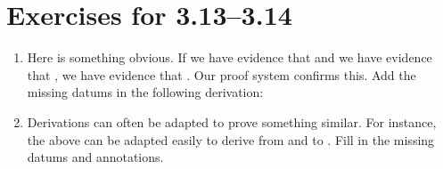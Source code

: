 
\section*{Exercises for 3.13--3.14}

\begin{enumerate}
\item  Here is something obvious. If we have evidence that  and we 
 have evidence that , we have evidence that . Our proof system 
 confirms this. Add the missing datums in the following derivation:

\begin{argument*}










\end{argument*}



\item Derivations can often be adapted to prove something similar. For instance, 
 the above can be adapted easily to derive from  
 and  to . Fill in the missing 
 datums and annotations.


\begin{argument*}








\end{argument*}
\end{enumerate}
